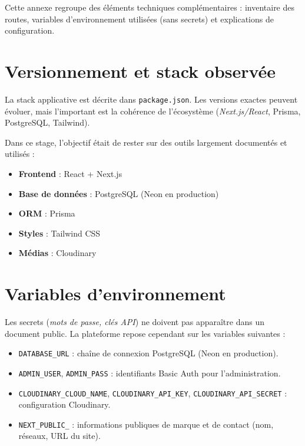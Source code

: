 Cette annexe regroupe des éléments techniques complémentaires : inventaire des routes, variables d’environnement utilisées (sans secrets) et explications de configuration.

\section{Versionnement et stack observée}
La stack applicative est décrite dans \texttt{package.json}. Les versions exactes peuvent évoluer, mais l’important est la cohérence de l’écosystème (\textit{Next.js/React}, Prisma, PostgreSQL, Tailwind).

Dans ce stage, l’objectif était de rester sur des outils largement documentés et utilisés :
\begin{itemize}
    \item \textbf{Frontend} : React + Next.js \cite{reactDocs,nextjsDocs}
    \item \textbf{Base de données} : PostgreSQL (Neon en production) \cite{neonDocs}
    \item \textbf{ORM} : Prisma \cite{prismaDocs}
    \item \textbf{Styles} : Tailwind CSS
    \item \textbf{Médias} : Cloudinary \cite{cloudinaryDocs}
\end{itemize}

\section{Variables d’environnement}
Les secrets (\textit{mots de passe, clés API}) ne doivent pas apparaître dans un document public. La plateforme repose cependant sur les variables suivantes :
\begin{itemize}
    \item \texttt{DATABASE\_URL} : chaîne de connexion PostgreSQL (Neon en production).
    \item \texttt{ADMIN\_USER}, \texttt{ADMIN\_PASS} : identifiants Basic Auth pour l’administration.
    \item \texttt{CLOUDINARY\_CLOUD\_NAME}, \texttt{CLOUDINARY\_API\_KEY}, \texttt{CLOUDINARY\_API\_SECRET} : configuration Cloudinary.
    \item \texttt{NEXT\_PUBLIC\_\*} : informations publiques de marque et de contact (nom, réseaux, URL du site).
\end{itemize}

